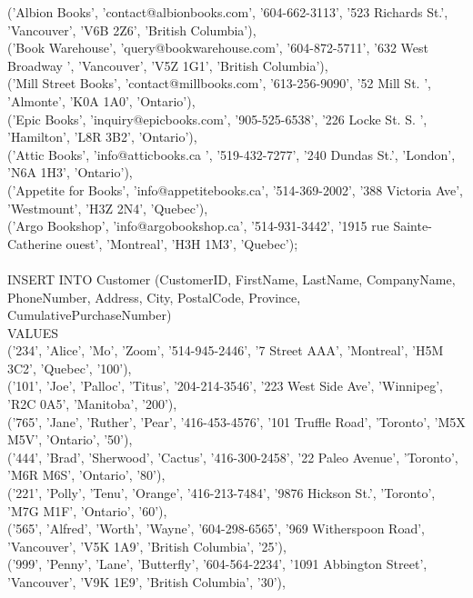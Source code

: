 \documentclass{scrreprt}
\begin{document}
       ('Albion Books', 'contact@albionbooks.com', '604-662-3113', '523 Richards St.', 'Vancouver', 'V6B 2Z6',
        'British Columbia'),\\
       ('Book Warehouse', 'query@bookwarehouse.com', '604-872-5711', '632 West Broadway ', 'Vancouver', 'V5Z 1G1',
        'British Columbia'),\\
       ('Mill Street Books', 'contact@millbooks.com', '613-256-9090', '52 Mill St. ', 'Almonte', 'K0A 1A0', 'Ontario'),\\
       ('Epic Books', 'inquiry@epicbooks.com', '905-525-6538', '226 Locke St. S. ', 'Hamilton', 'L8R 3B2', 'Ontario'),\\
       ('Attic Books', 'info@atticbooks.ca ', '519-432-7277', '240 Dundas St.', 'London', 'N6A 1H3', 'Ontario'),\\
       ('Appetite for Books', 'info@appetitebooks.ca', '514-369-2002', '388 Victoria Ave', 'Westmount', 'H3Z 2N4', 'Quebec'),\\
       ('Argo Bookshop', 'info@argobookshop.ca', '514-931-3442', '1915 rue Sainte-Catherine ouest', 'Montreal', 'H3H 1M3',
        'Quebec');\\\\
INSERT INTO Customer (CustomerID, FirstName, LastName, CompanyName, PhoneNumber, Address,
                      City, PostalCode, Province, CumulativePurchaseNumber)\\
VALUES\\('234', 'Alice', 'Mo', 'Zoom', '514-945-2446', '7 Street AAA', 'Montreal', 'H5M 3C2', 'Quebec', '100'),\\
       ('101', 'Joe', 'Palloc', 'Titus', '204-214-3546', '223 West Side Ave', 'Winnipeg', 'R2C 0A5', 'Manitoba', '200'),\\
       ('765', 'Jane', 'Ruther', 'Pear', '416-453-4576', '101 Truffle Road', 'Toronto', 'M5X M5V', 'Ontario', '50'),\\
       ('444', 'Brad', 'Sherwood', 'Cactus', '416-300-2458', '22 Paleo Avenue', 'Toronto', 'M6R M6S', 'Ontario', '80'),\\
       ('221', 'Polly', 'Tenu', 'Orange', '416-213-7484', '9876 Hickson St.', 'Toronto', 'M7G M1F', 'Ontario', '60'),\\
       ('565', 'Alfred', 'Worth', 'Wayne', '604-298-6565', '969 Witherspoon Road', 'Vancouver', 'V5K 1A9',
        'British Columbia', '25'),\\
       ('999', 'Penny', 'Lane', 'Butterfly', '604-564-2234', '1091 Abbington Street', 'Vancouver', 'V9K 1E9',
        'British Columbia', '30'),\\
\end{document}
